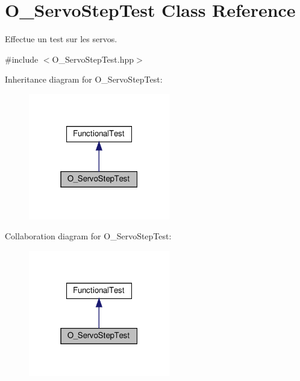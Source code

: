 \hypertarget{classO__ServoStepTest}{}\section{O\+\_\+\+Servo\+Step\+Test Class Reference}
\label{classO__ServoStepTest}


Effectue un test sur les servos.  




{\ttfamily \#include $<$O\+\_\+\+Servo\+Step\+Test.\+hpp$>$}



Inheritance diagram for O\+\_\+\+Servo\+Step\+Test\+:
\nopagebreak
\begin{figure}[H]
\begin{center}
\leavevmode
\includegraphics[width=175pt]{classO__ServoStepTest__inherit__graph}
\end{center}
\end{figure}


Collaboration diagram for O\+\_\+\+Servo\+Step\+Test\+:
\nopagebreak
\begin{figure}[H]
\begin{center}
\leavevmode
\includegraphics[width=175pt]{classO__ServoStepTest__coll__graph}
\end{center}
\end{figure}
